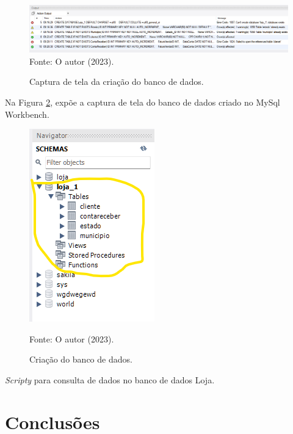  \begin{figure}[h!]

 \caption{Captura de tela da criação do banco de dados.}
 \includegraphics[width=\textwidth]{figure/fragmento.png}
 \label{fig:fragmento}
 {\fontsize{10pt}{\baselineskip}\selectfont
 Fonte: O autor (2023).}
 \end{figure}
\par Na Figura \ref{fig:banco}, expõe a captura de tela do banco de dados criado no MySql Workbench.
\newpage
 \begin{figure}[h!]
 \caption{Criação do banco de dados.}
 \begin{center}
    \includegraphics[scale=1]{figure/banco.png}
 \end{center}
 \label{fig:banco}
 {\fontsize{10pt}{\baselineskip}\selectfont
 Fonte: O autor (2023).}
 \end{figure}



\par \textit{Scripty} para consulta de dados no banco de dados Loja.







\section{Conclusões}


